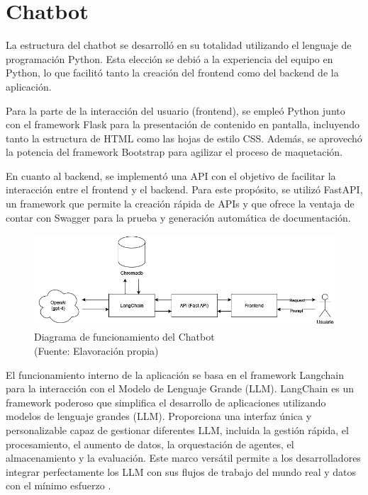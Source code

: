 \newpage

\section{Chatbot}

   
La estructura del chatbot se desarrolló en su totalidad utilizando el lenguaje de programación Python. Esta elección se debió a la 
experiencia del equipo en Python, lo que facilitó tanto la creación del frontend como del backend de la aplicación.

Para la parte de la interacción del usuario (frontend), se empleó Python junto con el framework Flask para la presentación 
de contenido en pantalla, incluyendo tanto la estructura de HTML como las hojas de estilo CSS. Además, se aprovechó la potencia del 
framework Bootstrap para agilizar el proceso de maquetación.

En cuanto al backend, se implementó una API con el objetivo de facilitar la interacción entre el frontend y el backend. Para este 
propósito, se utilizó FastAPI, un framework que permite la creación rápida de APIs y que ofrece la ventaja de contar con Swagger 
para la prueba y generación automática de documentación.

\begin{figure}[ht!]
    \centering
    \includegraphics[width=.8\textwidth]{figures/finalhuemul.png}
    \caption[Diagrama de funcionamiento del Chatbot]{Diagrama de funcionamiento del Chatbot\\
    {\scriptsize (Fuente: Elavoración propia)}}
    \label{fig:chatbot1}
\end{figure}

El funcionamiento interno de la aplicación se basa en el framework Langchain para la interacción con el Modelo de Lenguaje Grande (LLM). 
LangChain es un framework poderoso que simplifica el desarrollo de aplicaciones utilizando modelos de lenguaje grandes (LLM). Proporciona 
una interfaz única y personalizable capaz de gestionar diferentes LLM, incluida la gestión rápida, el procesamiento, el aumento de datos, 
la orquestación de agentes, el almacenamiento y la evaluación. Este marco versátil permite a los desarrolladores integrar perfectamente 
los LLM con sus flujos de trabajo del mundo real y datos con el mínimo esfuerzo \cite{langchain1}.

